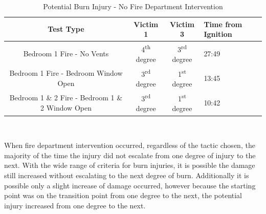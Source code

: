 \documentclass[12pt,oneside]{book}
\begin{document}
\begin{table}[H]
\centering
\caption{Potential Burn Injury - No Fire Department Intervention} 
\label{tab:TC_burn_inj_potential}
\begin{tabular}{|c|c|c|C{0.1\textwidth}|}
\hline
Test Type 											& Victim 1						& Victim 3						& Time from Ignition \\ \hline \hline
Bedroom 1 Fire - No Vents  							& 4\textsuperscript{th} degree 	& 3\textsuperscript{rd} degree 	& 27:49 	\\ \hline
Bedroom 1 Fire - Bedroom Window Open				& 3\textsuperscript{rd} degree 	& 1\textsuperscript{st} degree 	& 13:45 	\\ \hline
Bedroom 1 \& 2 Fire - Bedroom 1 \& 2 Window Open 	& 3\textsuperscript{rd} degree 	& 1\textsuperscript{st} degree 	& 10:42 	\\ \hline
\end{tabular} \\
\end{table}

When fire department intervention occurred, regardless of the tactic chosen, the majority of the time the injury did not escalate from one degree of injury to the next. With the wide range of criteria for burn injuries, it is possible the damage still increased without escalating to the next degree of burn. Additionally it is possible only a slight increase of damage occurred, however because the starting point was on the transition point from one degree to the next, the potential injury increased from one degree to the next. 
\end{document}
